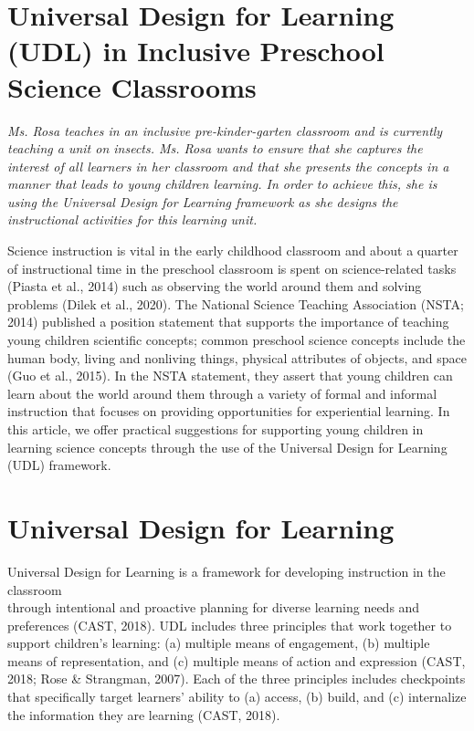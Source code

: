 \documentclass[11.5pt]{sig-alternate}
\begin{document}
\section*{Universal Design for Learning (UDL) in Inclusive Preschool Science Classrooms}
\begin{large}

\emph {Ms. Rosa teaches in an inclusive pre-kinder-garten classroom and is currently teaching a unit on insects. Ms. Rosa wants to ensure that she captures the interest of all learners in her classroom and that she presents the concepts in a manner that leads to young children learning. In order to achieve this, she is using the Universal Design for Learning framework as she designs the instructional activities for this learning unit.}

Science instruction is vital in the early childhood classroom and about a quarter of instructional time in the preschool classroom is spent on science-related tasks (Piasta et al., 2014) such as observing the world around them and solving problems (Dilek et al., 2020). The National Science Teaching Association (NSTA; 
\\2014) published a position statement that supports the importance of teaching young children scientific concepts; common preschool science concepts include the human body, living and nonliving things, physical attributes of objects, and space (Guo et al., 2015). In the NSTA statement, they assert that young children can learn about the world around them through a variety of formal and informal instruction that focuses on providing opportunities for experiential learning. In this article, we offer practical suggestions for supporting young children in learning science concepts through the use of the Universal Design for Learning (UDL) framework.

\section*{Universal Design for Learning}

Universal Design for Learning is a framework for developing instruction in the classroom \\through intentional and proactive planning for diverse learning needs and preferences (CAST, 2018). UDL includes three principles that work together to support children’s learning: (a) multiple means of engagement, (b) multiple means of representation, and (c) multiple means of action and expression (CAST, 2018; Rose \& Strangman, 2007). Each of the three principles includes checkpoints that specifically target learners’ ability to (a) access, (b) build, and (c) internalize the information they are learning (CAST, 2018).


\end{large}
\end{document}
